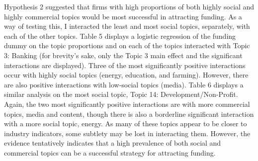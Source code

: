 \documentclass[12pt]{article}
\begin{document}
Hypothesis 2 suggested that firms with high proportions of both highly social and highly commercial topics would be most successful in attracting funding. As a way of testing this, I interacted the least and most social topics, separately, with each of the other topics. Table 5 displays a logistic regression of the funding dummy on the topic proportions and on each of the topics interacted with Topic 3: Banking (for brevity's sake, only the Topic 3 main effect and the significant interactions are displayed). Three of the most significantly positive interactions occur with highly social topics (energy, education, and farming). However, there are also positive interactions with low-social topics (media). Table 6 displays a similar analysis on the most social topic, Topic 14: Development/Non-Profit. Again, the two most significantly positive interactions are with more commercial topics, media and content, though there is also a borderline significant interaction with a more social topic, energy. As many of these topics appear to be closer to industry indicators, some subtlety may be lost in interacting them. However, the evidence tentatively indicates that a high prevalence of both social and commercial topics can be a successful strategy for attracting funding.
\end{document}
